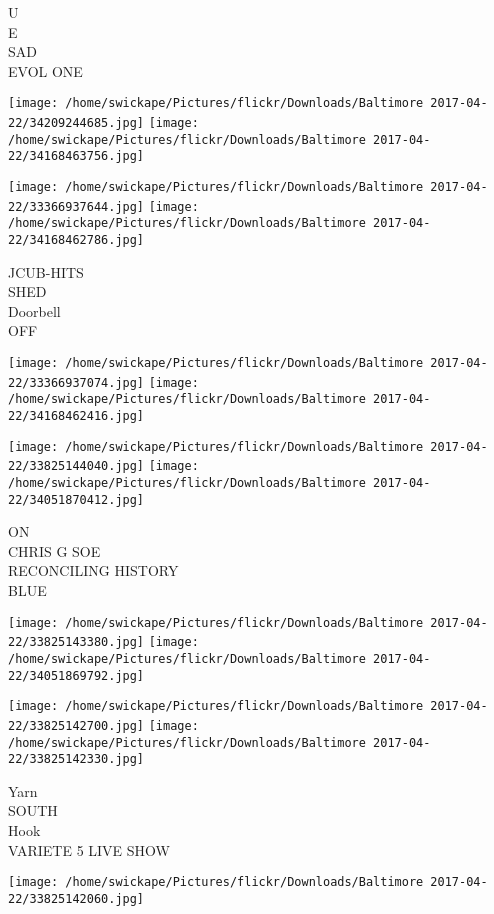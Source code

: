 \documentclass[10pt,letterpaper]{article}
\begin{document}
U\\
E\\
SAD\\
EVOL ONE\\
\pagebreak

\texttt{[image: /home/swickape/Pictures/flickr/Downloads/Baltimore 2017-04-22/34209244685.jpg]}
\texttt{[image: /home/swickape/Pictures/flickr/Downloads/Baltimore 2017-04-22/34168463756.jpg]}

\texttt{[image: /home/swickape/Pictures/flickr/Downloads/Baltimore 2017-04-22/33366937644.jpg]}
\texttt{[image: /home/swickape/Pictures/flickr/Downloads/Baltimore 2017-04-22/34168462786.jpg]}

JCUB{-}HITS\\
SHED\\
Doorbell\\
OFF\\
\pagebreak

\texttt{[image: /home/swickape/Pictures/flickr/Downloads/Baltimore 2017-04-22/33366937074.jpg]}
\texttt{[image: /home/swickape/Pictures/flickr/Downloads/Baltimore 2017-04-22/34168462416.jpg]}

\texttt{[image: /home/swickape/Pictures/flickr/Downloads/Baltimore 2017-04-22/33825144040.jpg]}
\texttt{[image: /home/swickape/Pictures/flickr/Downloads/Baltimore 2017-04-22/34051870412.jpg]}

ON\\
CHRIS G SOE\\
RECONCILING HISTORY\\
BLUE\\
\pagebreak

\texttt{[image: /home/swickape/Pictures/flickr/Downloads/Baltimore 2017-04-22/33825143380.jpg]}
\texttt{[image: /home/swickape/Pictures/flickr/Downloads/Baltimore 2017-04-22/34051869792.jpg]}

\texttt{[image: /home/swickape/Pictures/flickr/Downloads/Baltimore 2017-04-22/33825142700.jpg]}
\texttt{[image: /home/swickape/Pictures/flickr/Downloads/Baltimore 2017-04-22/33825142330.jpg]}

Yarn\\
SOUTH\\
Hook\\
VARIETE 5 LIVE SHOW\\
\pagebreak

\texttt{[image: /home/swickape/Pictures/flickr/Downloads/Baltimore 2017-04-22/33825142060.jpg]}
\end{document}
